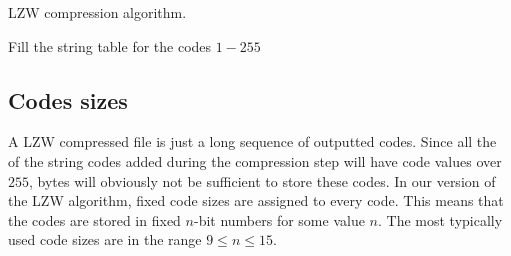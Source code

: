 \begin{algorithm}[H]
  \caption{LZW compression algorithm.}
  \label{alg:lzw-compression}
  \begin{algorithmic}[1]


    \State Fill the string table for the codes $1-255$
     

    \While{\neof}

       \label{algl:hasingcheckintable}

      \Else

        \State {}

          

          \State {}\label{algl:hashadd}

        \EndIf


      \EndIf


    \EndWhile

    \State {}
    \State {}
  \end{algorithmic}
\end{algorithm}

\subsection{Codes sizes}

A LZW compressed file is just a long sequence of outputted codes.
Since all the of the string codes added during the compression step
will have code values over $255$, bytes will obviously not be
sufficient to store these codes. In our version of the LZW algorithm,
fixed code sizes are assigned to every code. This means that the codes
are stored in fixed $n$-bit numbers for some value $n$. The most
typically used code sizes are in the range $9 \leq n \leq 15$.

